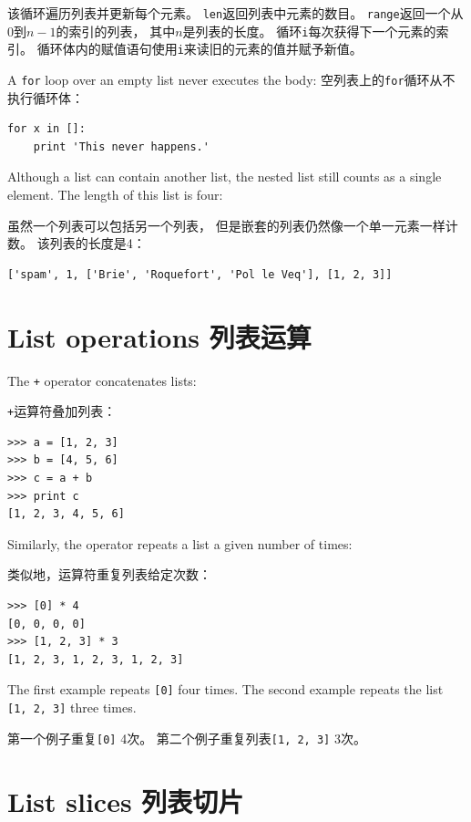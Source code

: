 \documentclass[10pt]{book}
\begin{document}
\begin{CJK}{UTF8}{gbsn}
该循环遍历列表并更新每个元素。
{\tt len}返回列表中元素的数目。
{\tt range}返回一个从0到$n-1$的索引的列表，
其中$n$是列表的长度。
循环{\tt i}每次获得下一个元素的索引。
循环体内的赋值语句使用{\tt i}来读旧的元素的值并赋予新值。

A {\tt for} loop over an empty list never executes the body:
空列表上的{\tt for}循环从不执行循环体：

\begin{verbatim}
for x in []:
    print 'This never happens.'
\end{verbatim}
%
Although a list can contain another list, the nested
list still counts as a single element.  The length of this list is
four:

虽然一个列表可以包括另一个列表，
但是嵌套的列表仍然像一个单一元素一样计数。
该列表的长度是4：

\begin{verbatim}
['spam', 1, ['Brie', 'Roquefort', 'Pol le Veq'], [1, 2, 3]]
\end{verbatim}



\section{List operations 列表运算}

The {\tt +} operator concatenates lists:

{\tt +}运算符叠加列表：

\begin{verbatim}
>>> a = [1, 2, 3]
>>> b = [4, 5, 6]
>>> c = a + b
>>> print c
[1, 2, 3, 4, 5, 6]
\end{verbatim}
%
Similarly, the {\tt *} operator repeats a list a given number of times:

类似地，{\tt *}运算符重复列表给定次数：

\begin{verbatim}
>>> [0] * 4
[0, 0, 0, 0]
>>> [1, 2, 3] * 3
[1, 2, 3, 1, 2, 3, 1, 2, 3]
\end{verbatim}
%
The first example repeats {\tt [0]} four times.  The second example
repeats the list {\tt [1, 2, 3]} three times.

第一个例子重复{\tt [0]} 4次。
第二个例子重复列表{\tt [1, 2, 3]} 3次。


\section{List slices 列表切片}


\end{CJK}
\end{document}
